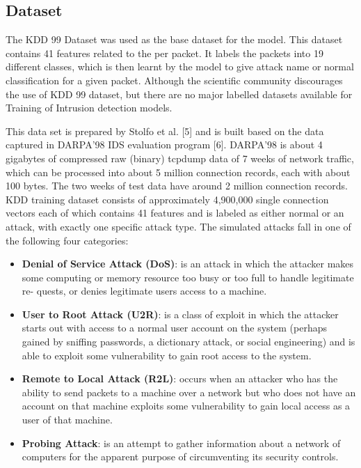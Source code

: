 \documentclass[12pt]{article}
\theoremstyle{definition}
\begin{document}
		\subsection{Dataset}
		The KDD 99 Dataset was used as the base dataset for the model. This dataset contains 41 features related to the per packet. It labels the packets into 19 different classes, which is then learnt by the model to give attack name or normal classification for a given packet. Although the scientific community discourages the use of KDD 99 dataset, but there are no major labelled datasets available for Training of Intrusion detection models.
		
		This data set is prepared by Stolfo et al. [5] and is built
		based on the data captured in DARPA’98 IDS evaluation
		program [6]. DARPA’98 is about 4 gigabytes of compressed
		raw (binary) tcpdump data of 7 weeks of network traffic,
		which can be processed into about 5 million connection
		records, each with about 100 bytes. The two weeks of
		test data have around 2 million connection records. KDD
		training dataset consists of approximately 4,900,000 single
		connection vectors each of which contains 41 features and
		is labeled as either normal or an attack, with exactly one
		specific attack type. The simulated attacks fall in one of the
		following four categories:
		
		\begin{itemize}
			\item \textbf{Denial of Service Attack (DoS)}: is an attack in
			which the attacker makes some computing or memory
			resource too busy or too full to handle legitimate re-
			quests, or denies legitimate users access to a machine.
			\item \textbf{User to Root Attack (U2R)}: is a class of exploit in
			which the attacker starts out with access to a normal
			user account on the system (perhaps gained by sniffing
			passwords, a dictionary attack, or social engineering)
			and is able to exploit some vulnerability to gain root
			access to the system.
			\item  \textbf{Remote to Local Attack (R2L)}: occurs when an
			attacker who has the ability to send packets to a
			machine over a network but who does not have an
			account on that machine exploits some vulnerability to
			gain local access as a user of that machine.
			\item  \textbf{Probing Attack}: is an attempt to gather information
			about a network of computers for the apparent purpose
			of circumventing its security controls.
		\end{itemize}
		
\end{document}
